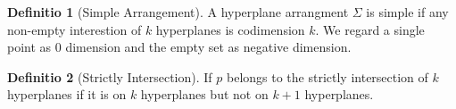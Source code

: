 \documentclass[12pt, a4paper]{article}
\newtheorem{lem}[theorem]{Lemma}
\theoremstyle{definition}
\newtheorem{definition}{Definitio}[section]
\theoremstyle{remark}
\renewcommand{\emph}[1]{\textit{\textbf{#1}}}
\begin{document}
\begin{definition}[Simple Arrangement]
A hyperplane arrangment $\Sigma$ is simple if any non-empty interestion of $k$ hyperplanes is codimension $k$.
We regard a single point as 0 dimension and the empty set as negative dimension.
\end{definition}

\begin{definition}[Strictly Intersection]
	If $p$ belongs to the strictly intersection of $k$ hyperplanes if it is on $k$ hyperplanes but not on $k+1$ hyperplanes.
\end{definition}

%
%
\end{document}
